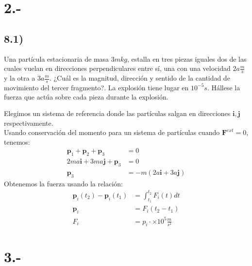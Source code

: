 \documentclass{article}
\begin{document}
\section*{2.-}  
\subsection*{8.1)}
Una partícula estacionaria de masa $3m kg$, estalla en tres piezas iguales dos de las cuales
vuelan en direcciones perpendiculares entre sí, una con una velocidad $2a \frac{m}{s}$ y la
otra a $3a\frac{m}{s}$. ¿Cuál es la magnitud, dirección y sentido de la cantidad de movimiento 
del tercer fragmento?. La explosión tiene lugar en $10^{-5}s$. Hállese la fuerza que actúa sobre 
cada pieza durante la explosión.
\begin{tcolorbox}[breakable]
    Elegimos un sistema de referencia donde las partículas salgan en direcciones $\bm{i},\bm{j}$ respectivamente. \\
    Usando conservación del momento para un sistema de partículas cuando $\bm{F}^{ext} = 0$, tenemos:
    \begin{align*}
        \bm{p}_1 + \bm{p}_2 + \bm{p}_3 &= 0 \\
        2ma \bm{i} + 3ma \bm{j} + \bm{p}_3 &= 0 \\
        \bm{p}_3 &= -m(2a\bm{i} + 3a \bm{j})
    \end{align*}
    Obtenemos la fuerza usando la relación:
    \begin{align*}
        \bm{p}_i(t_2) - \bm{p}_i(t_1) &= \int_{t_1}^{t_2} F_i(t)dt \\
        \bm{p}_i &= F_i(t_2-t_1) \\
        F_i &= p_i \cdot \times 10^5 \tfrac{m}{s^2}
    \end{align*}
\end{tcolorbox}

\section*{3.-}
\end{document}
